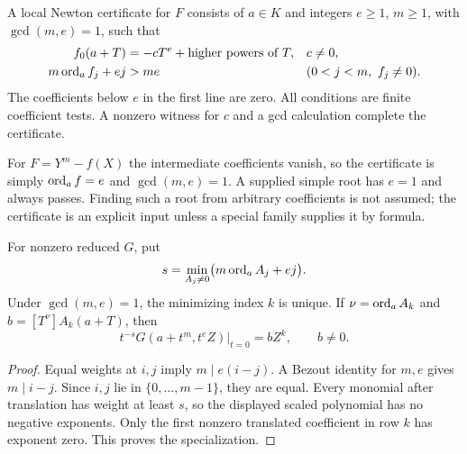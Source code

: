 \begin{definition}\label{def:local-certificate}
A local Newton certificate for $F$ consists of $a\in K$ and integers $e\ge1$, $m\ge1$, with $\gcd(m,e)=1$, such that
\begin{align}
 f_0(a+T)&=-cT^e+\text{higher powers of }T,
       &&c\ne0,\label{eq:local-constant}\\
 m\operatorname{ord}_a f_j+e j&>me
       &&(0<j<m,\ f_j\ne0).\label{eq:local-upper}
\end{align}
The coefficients below $e$ in the first line are zero. All conditions are finite coefficient tests. A nonzero witness for $c$ and a gcd calculation complete the certificate.
\end{definition}

For $F=Y^m-f(X)$ the intermediate coefficients vanish, so the certificate is simply $\operatorname{ord}_a f=e$ and $\gcd(m,e)=1$. A supplied simple root has $e=1$ and always passes. Finding such a root from arbitrary coefficients is not assumed; the certificate is an explicit input unless a special family supplies it by formula.

\begin{lemma}\label{lem:local-unique}
For nonzero reduced $G$, put
\[
 s=\min_{A_j\ne0}\bigl(m\operatorname{ord}_aA_j+ej\bigr).
\]
Under $\gcd(m,e)=1$, the minimizing index $k$ is unique. If $\nu=\operatorname{ord}_aA_k$ and $b=[T^\nu]A_k(a+T)$, then
\[
 t^{-s}G(a+t^m,t^eZ)\big|_{t=0}=bZ^k,\qquad b\ne0.
\]
\end{lemma}
\begin{proof}
Equal weights at $i,j$ imply $m\mid e(i-j)$. A Bezout identity for $m,e$ gives $m\mid i-j$. Since $i,j$ lie in $\{0,\ldots,m-1\}$, they are equal. Every monomial after translation has weight at least $s$, so the displayed scaled polynomial has no negative exponents. Only the first nonzero translated coefficient in row $k$ has exponent zero. This proves the specialization.
\end{proof}

